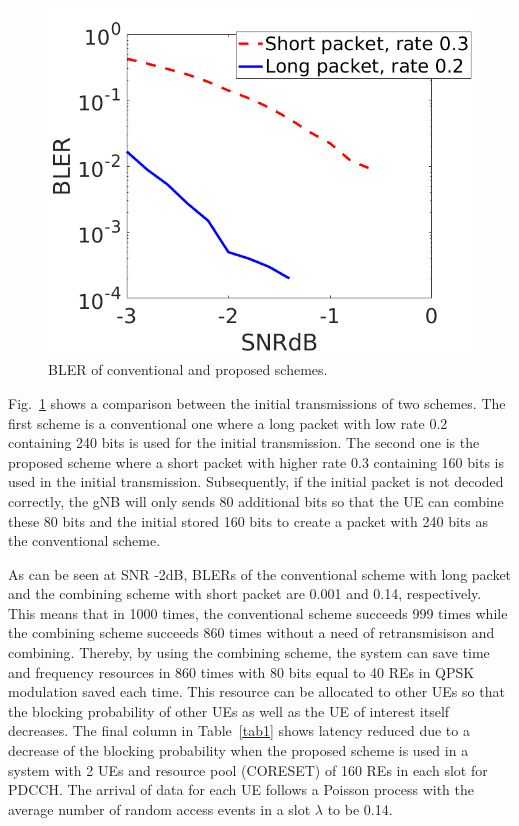 \documentclass[conference,10pt]{IEEEtran}
\begin{document}
\begin{figure}[htb]
\centerline{\includegraphics[scale=0.3]{fig8.png}}
\caption{BLER of conventional and proposed schemes.}
\label{fig8}
\end{figure}

Fig.~\ref{fig8} shows a comparison between the initial transmissions of two schemes. The first scheme is a conventional one where a long packet with low rate 0.2 containing 240 bits is used for the initial transmission. The second one is the proposed scheme where a short packet with higher rate 0.3 containing 160 bits is used in the initial transmission. Subsequently, if the initial packet is not decoded correctly, the gNB will only sends 80 additional bits so that the UE can combine these 80 bits and the initial stored 160 bits to create a packet with 240 bits as the conventional scheme. 

As can be seen at SNR -2dB, BLERs of the conventional scheme with long packet and the combining scheme with short packet are 0.001 and 0.14, respectively. This means that in 1000 times, the conventional scheme succeeds 999 times while the combining scheme succeeds 860 times without a need of retransmisison and combining. Thereby, by using the combining scheme, the system can save time and frequency resources in 860 times with 80 bits equal to 40 REs in QPSK modulation saved each time. This resource can be allocated to other UEs so that the blocking probability of other UEs as well as the UE of interest itself decreases. The final column in Table~\ref{tab1} shows latency reduced due to a decrease of the blocking probability when the proposed scheme is used in a system with 2 UEs and resource pool (CORESET) of 160 REs in each slot for PDCCH. The arrival of data for each UE follows a Poisson process with the average number of random access events in a slot $\lambda$ to be 0.14.
\end{document}
